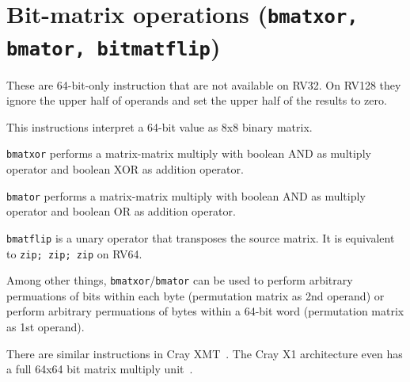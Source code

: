 \section{Bit-matrix operations (\texttt{bmatxor, bmator, bitmatflip})}

These are 64-bit-only instruction that are not available on RV32. On RV128 they
ignore the upper half of operands and set the upper half of the results to zero.

This instructions interpret a 64-bit value as 8x8 binary matrix.

\texttt{bmatxor} performs a matrix-matrix multiply with boolean AND as multiply
operator and boolean XOR as addition operator.

\texttt{bmator} performs a matrix-matrix multiply with boolean AND as multiply
operator and boolean OR as addition operator.

\texttt{bmatflip} is a unary operator that transposes the source matrix. It is
equivalent to \texttt{zip; zip; zip} on RV64.

Among other things, \texttt{bmatxor}/\texttt{bmator} can be used to perform
arbitrary permuations of bits within each byte (permutation matrix as 2nd
operand) or perform arbitrary permuations of bytes within a 64-bit word
(permutation matrix as 1st operand).

There are similar instructions in Cray XMT~\cite{CrayXMT}. The Cray X1
architecture even has a full 64x64 bit matrix multiply unit~\cite{CrayX1}.
